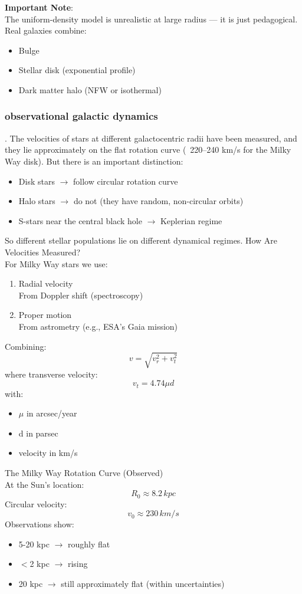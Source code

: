 \documentclass[14pt,a4paper]{article}
\begin{document}
\textbf{Important Note}:\\
The uniform-density model is unrealistic at large radius — it is just pedagogical.\\
Real galaxies combine:\\
\begin{itemize}
\item Bulge
\item Stellar disk (exponential profile)
\item Dark matter halo (NFW or isothermal)
\end{itemize}
\subsubsection{observational galactic dynamics}.
The velocities of stars at different galactocentric radii have been measured, and they lie approximately on the flat rotation curve (~220–240 km/s for the Milky Way disk). But there is an important distinction:
\begin{itemize}
\item Disk stars \(\rightarrow\) follow circular rotation curve
\item Halo stars \(\rightarrow\) do not (they have random, non-circular orbits)
\item S-stars near the central black hole \(\rightarrow\) Keplerian regime
\end{itemize}
So different stellar populations lie on different dynamical regimes.
How Are Velocities Measured?\\
For Milky Way stars we use:
\begin{enumerate}
\item Radial velocity\\
From Doppler shift (spectroscopy)
\item Proper motion\\
From astrometry (e.g., ESA's Gaia mission)
\end{enumerate}
Combining:
\[ v=\sqrt{v_r^2+v_t^2} \]
where transverse velocity:
\[v_t=4.74 \mu d\]
with:
\begin{itemize}
\item \(\mu\) in arcsec/year
\item d in parsec
\item velocity in km/s
\end{itemize}
The Milky Way Rotation Curve (Observed)\\
At the Sun's location:
\[R_0\approx 8.2\,kpc\]
Circular velocity:
\[ v_0\approx230\,km/s\]
Observations show:
\begin{itemize}
\item 5-20 kpc \(\rightarrow\) roughly flat
\item \(<\)2 kpc \(\rightarrow\) rising
\item 20 kpc \(\rightarrow\) still approximately flat (within uncertainties)
\end{itemize}
\clearpage
\end{document}

